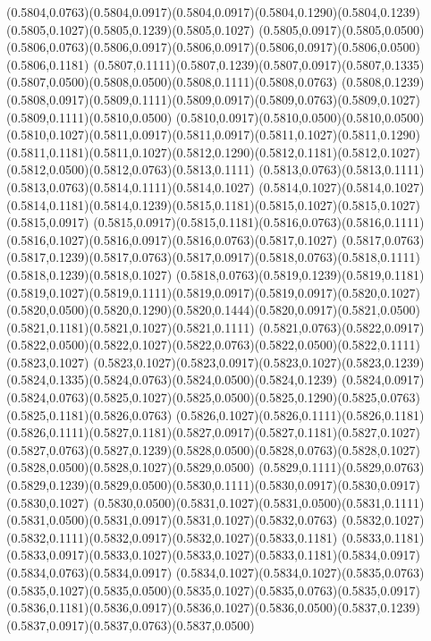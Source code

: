 (0.5804,0.0763)(0.5804,0.0917)(0.5804,0.0917)(0.5804,0.1290)(0.5804,0.1239)(0.5805,0.1027)(0.5805,0.1239)(0.5805,0.1027)
(0.5805,0.0917)(0.5805,0.0500)(0.5806,0.0763)(0.5806,0.0917)(0.5806,0.0917)(0.5806,0.0917)(0.5806,0.0500)(0.5806,0.1181)
(0.5807,0.1111)(0.5807,0.1239)(0.5807,0.0917)(0.5807,0.1335)(0.5807,0.0500)(0.5808,0.0500)(0.5808,0.1111)(0.5808,0.0763)
(0.5808,0.1239)(0.5808,0.0917)(0.5809,0.1111)(0.5809,0.0917)(0.5809,0.0763)(0.5809,0.1027)(0.5809,0.1111)(0.5810,0.0500)
(0.5810,0.0917)(0.5810,0.0500)(0.5810,0.0500)(0.5810,0.1027)(0.5811,0.0917)(0.5811,0.0917)(0.5811,0.1027)(0.5811,0.1290)
(0.5811,0.1181)(0.5811,0.1027)(0.5812,0.1290)(0.5812,0.1181)(0.5812,0.1027)(0.5812,0.0500)(0.5812,0.0763)(0.5813,0.1111)
(0.5813,0.0763)(0.5813,0.1111)(0.5813,0.0763)(0.5814,0.1111)(0.5814,0.1027)
\PST@Solid(0.5814,0.1027)(0.5814,0.1027)(0.5814,0.1181)(0.5814,0.1239)(0.5815,0.1181)(0.5815,0.1027)(0.5815,0.1027)(0.5815,0.0917)
(0.5815,0.0917)(0.5815,0.1181)(0.5816,0.0763)(0.5816,0.1111)(0.5816,0.1027)(0.5816,0.0917)(0.5816,0.0763)(0.5817,0.1027)
(0.5817,0.0763)(0.5817,0.1239)(0.5817,0.0763)(0.5817,0.0917)(0.5818,0.0763)(0.5818,0.1111)(0.5818,0.1239)(0.5818,0.1027)
(0.5818,0.0763)(0.5819,0.1239)(0.5819,0.1181)(0.5819,0.1027)(0.5819,0.1111)(0.5819,0.0917)(0.5819,0.0917)(0.5820,0.1027)
(0.5820,0.0500)(0.5820,0.1290)(0.5820,0.1444)(0.5820,0.0917)(0.5821,0.0500)(0.5821,0.1181)(0.5821,0.1027)(0.5821,0.1111)
(0.5821,0.0763)(0.5822,0.0917)(0.5822,0.0500)(0.5822,0.1027)(0.5822,0.0763)(0.5822,0.0500)(0.5822,0.1111)(0.5823,0.1027)
(0.5823,0.1027)(0.5823,0.0917)(0.5823,0.1027)(0.5823,0.1239)(0.5824,0.1335)(0.5824,0.0763)(0.5824,0.0500)(0.5824,0.1239)
(0.5824,0.0917)(0.5824,0.0763)(0.5825,0.1027)(0.5825,0.0500)(0.5825,0.1290)(0.5825,0.0763)(0.5825,0.1181)(0.5826,0.0763)
(0.5826,0.1027)(0.5826,0.1111)(0.5826,0.1181)(0.5826,0.1111)(0.5827,0.1181)(0.5827,0.0917)(0.5827,0.1181)(0.5827,0.1027)
(0.5827,0.0763)(0.5827,0.1239)(0.5828,0.0500)(0.5828,0.0763)(0.5828,0.1027)(0.5828,0.0500)(0.5828,0.1027)(0.5829,0.0500)
(0.5829,0.1111)(0.5829,0.0763)(0.5829,0.1239)(0.5829,0.0500)(0.5830,0.1111)(0.5830,0.0917)(0.5830,0.0917)(0.5830,0.1027)
(0.5830,0.0500)(0.5831,0.1027)(0.5831,0.0500)(0.5831,0.1111)(0.5831,0.0500)(0.5831,0.0917)(0.5831,0.1027)(0.5832,0.0763)
(0.5832,0.1027)(0.5832,0.1111)(0.5832,0.0917)(0.5832,0.1027)(0.5833,0.1181)
\PST@Solid(0.5833,0.1181)(0.5833,0.0917)(0.5833,0.1027)(0.5833,0.1027)(0.5833,0.1181)(0.5834,0.0917)(0.5834,0.0763)(0.5834,0.0917)
(0.5834,0.1027)(0.5834,0.1027)(0.5835,0.0763)(0.5835,0.1027)(0.5835,0.0500)(0.5835,0.1027)(0.5835,0.0763)(0.5835,0.0917)
(0.5836,0.1181)(0.5836,0.0917)(0.5836,0.1027)(0.5836,0.0500)(0.5837,0.1239)(0.5837,0.0917)(0.5837,0.0763)(0.5837,0.0500)
